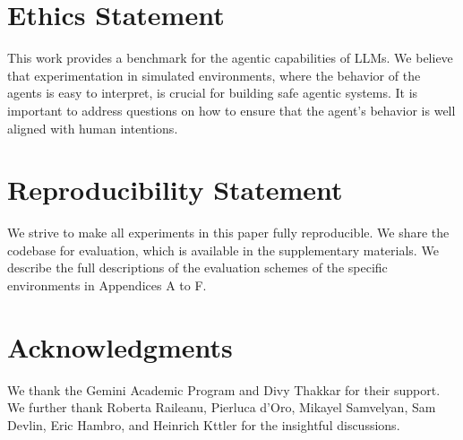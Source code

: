 \vspace{-3mm}
\section*{Ethics Statement}

This work provides a benchmark for the agentic capabilities of LLMs. We believe that experimentation in simulated environments, where the behavior of the agents is easy to interpret, is crucial for building safe agentic systems. It is important to address questions on how to ensure that the agent's behavior is well aligned with human intentions.

\section*{Reproducibility Statement}
We strive to make all experiments in this paper fully reproducible. We share the codebase for evaluation, which is available in the supplementary materials. We describe the full descriptions of the evaluation schemes of the specific environments in  Appendices A to F.

\section*{Acknowledgments}
We thank the Gemini Academic Program and Divy Thakkar for their support. We further thank Roberta Raileanu, Pierluca d'Oro, Mikayel Samvelyan, Sam Devlin, Eric Hambro, and Heinrich Kttler for the insightful discussions.
